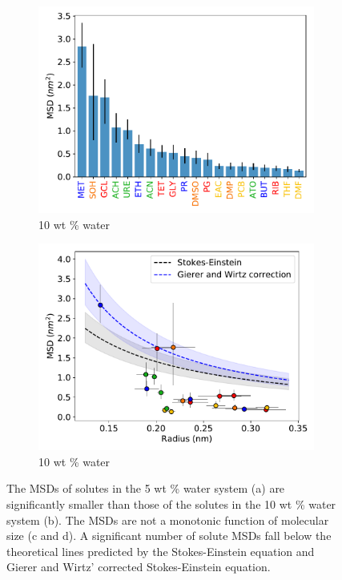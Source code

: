 \documentclass{article}
\begin{document}
  \begin{figure}[!htb]
  \centering
  \begin{subfigure}{0.45\textwidth}
  \includegraphics[width=\textwidth]{all_10wt_tamsds.pdf}
  \caption{10 wt \% water}\label{fig:all_msds_10wt}
  \end{subfigure}
  \begin{subfigure}{0.45\textwidth}
  \includegraphics[width=\textwidth]{msd_radius_10wt.pdf}
  \caption{10 wt \% water}\label{fig:msd_radius_10wt}
  \end{subfigure}
  \caption{The MSDs of solutes in the 5 wt \% water system (a) are significantly
  smaller than those of the solutes in the 10 wt \% water system (b). The
  MSDs are not a monotonic function of molecular size (c and d). A significant
  number of solute MSDs fall below the theoretical lines predicted by the
  Stokes-Einstein equation and Gierer and Wirtz' corrected Stokes-Einstein equation.
  }\label{fig:msds}
  \end{figure}
  
\end{document}
